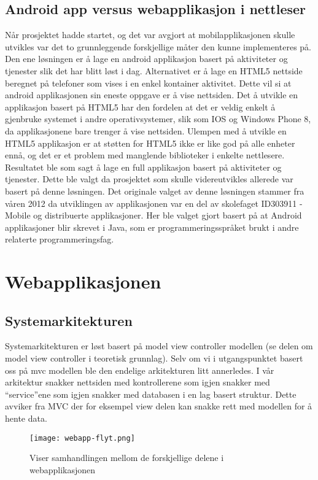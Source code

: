\documentclass[../main.tex]{subfiles}
\begin{document}
\subsection{Android app versus webapplikasjon i nettleser}
Når prosjektet hadde startet, og det var avgjort at mobilapplikasjonen skulle utvikles var det to grunnleggende forskjellige måter den kunne implementeres på. Den ene løsningen er å lage en android applikasjon basert på aktiviteter og tjenester slik det har blitt løst i dag. Alternativet er å lage en HTML5 nettside beregnet på telefoner som vises i en enkel kontainer aktivitet. Dette vil si at android applikasjonen sin eneste oppgave er å vise nettsiden.\newline
Det å utvikle en applikasjon basert på HTML5 har den fordelen at det er veldig enkelt å gjenbruke systemet i andre operativsystemer, slik som IOS og Windows Phone 8, da applikasjonene bare trenger å vise nettsiden. Ulempen med å utvikle en HTML5 applikasjon er at støtten for HTML5 ikke er like god på alle enheter ennå, og det er et problem med manglende biblioteker i enkelte nettlesere. \newline
Resultatet ble som sagt å lage en full applikasjon basert på aktiviteter og tjenester. Dette ble valgt da prosjektet som skulle videreutvikles allerede var basert på denne løsningen. Det originale valget av denne løsningen stammer fra våren 2012 da utviklingen av applikasjonen var en del av skolefaget ID303911 - Mobile og distribuerte applikasjoner. Her ble valget gjort basert på at Android applikasjoner blir skrevet i Java, som er programmeringsspråket brukt i andre relaterte programmeringsfag.

\section{Webapplikasjonen}

\subsection{Systemarkitekturen}
Systemarkitekturen er løst basert på model view controller modellen (se delen om model view controller i teoretisk grunnlag). Selv om vi i utgangspunktet basert oss på mvc modellen ble den endelige arkitekturen litt annerledes. I vår arkitektur snakker nettsiden med kontrollerene som igjen snakker med “service”ene som igjen snakker med databasen i en lag basert struktur. Dette avviker fra MVC der for eksempel view delen kan snakke rett med modellen for å hente data.
\begin{figure}[H]
  \centering
  \texttt{[image: webapp-flyt.png]}
  \caption{Viser samhandlingen mellom de forskjellige delene i webapplikasjonen}
\end{figure}
\end{document}
